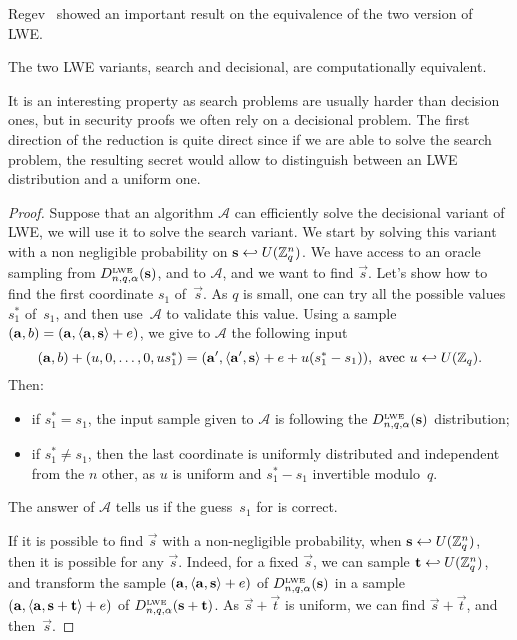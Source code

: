 Regev~\cite{Reg05} showed an important result on the equivalence of the two version of LWE.

\begin{lemma}
The two LWE variants, search and decisional, are computationally equivalent.
\end{lemma}

It is an interesting property as search problems are usually harder than decision ones, but in security proofs we often rely on a decisional problem. The first direction of the reduction is quite direct since if we are able to solve the search problem, the resulting secret would allow to distinguish between an LWE distribution and a uniform one.


\begin{proof}
Suppose that an algorithm $\mathcal{A}$ can efficiently solve the decisional variant of LWE, we will use it to solve the search variant.
We start by solving this variant with a non negligible probability on $\vec{s} \hookleftarrow U(\mZ_q^n)$. 
We have access to an oracle sampling from $D^{\mbox{\tiny LWE}}_{n,q,\alpha}(\vec{s})$, and to $\mathcal{A}$, 
and we want to find $\vec{s}$. Let's show how to find the first coordinate $s_1$ 
of~$\vec{s}$. As $q$ is small, one can try all the possible values $s_1^*$ of~$s_1$, and then use~$\mathcal{A}$ to validate this value. Using a sample $(\vec{a},b)= (\vec{a}, \ps{\vec{a}}{\vec{s}} + e)$, 
we give to $\mathcal{A}$ the following input 
\[(\vec{a},b)+ (u,0,\ldots,0, u s_1^*) = (\vec{a}', \ps{\vec{a}'}{\vec{s}} + e + u (s_1^*-s_1)), \ 
\mbox{avec} \ u \hookleftarrow U(\mZ_q).
\]
Then:
\begin{itemize}
\item if $s_1^* = s_1$, the input sample given to $\mathcal{A}$ is following the
$D^{\mbox{\tiny LWE}}_{n,q,\alpha}(\vec{s})$ distribution;
\item if $s_1^* \neq  s_1$, then the last coordinate is uniformly distributed and independent from the $n$ other, as $u$ is uniform and $s_1^*-s_1$ invertible modulo~$q$.
\end{itemize}   
The answer of $\mathcal{A}$ tells us if the guess~$s_1$ for is correct.

If it is possible to find $\vec{s}$ with a non-negligible probability, when $\vec{s} \hookleftarrow U(\mZ_q^n)$, then it is possible for any $\vec{s}$.
Indeed, for a fixed $\vec{s}$, we can sample $\vec{t} \hookleftarrow U(\mZ_q^{n})$, and transform the sample $(\vec{a},\ps{\vec{a}}{\vec{s}} + e)$ of $D^{\mbox{\tiny LWE}}_{n,q,\alpha}(\vec{s})$ in a sample $(\vec{a},\ps{\vec{a}}{\vec{s} + \vec{t}} + e)$ of $D^{\mbox{\tiny LWE}}_{n,q,\alpha}(\vec{s}+\vec{t})$.
As $\vec{s}+\vec{t}$ is uniform, we can find $\vec{s}+\vec{t}$, and then~$\vec{s}$.
\end{proof}

